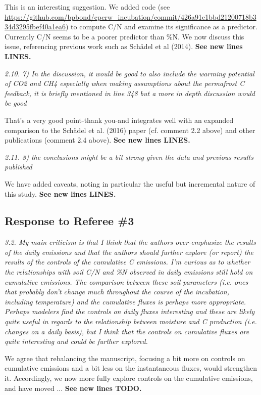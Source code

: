 \documentclass[11pt, oneside]{article}
\begin{document}
This is an interesting suggestion. We added code (see \url{https://github.com/bpbond/cpcrw_incubation/commit/426a91e1bbd21200718b334d3295fbef40a1ea6}) to compute C/N and examine its significance as a predictor. Currently C/N seems to be a poorer predictor than \%N. We now discuss this issue, referencing previous work such as Schädel et al (2014). {\bf See new lines LINES.}

\medskip
{\it 2.10. 7) In the discussion, it would be good to also include the warming potential of CO2 and CH4 especially when making assumptions about the permafrost C feedback, it is briefly mentioned in line 348 but a more in depth discussion would be good }

That's a very good point-thank you-and integrates well with an expanded comparison to the Schädel et al. (2016) paper (cf. comment 2.2 above) and other publications (comment 2.4 above). {\bf See new lines LINES.}

\medskip
{\it 2.11. 8) the conclusions might be a bit strong given the data and previous results published }

We have added caveats, noting in particular the useful but incremental nature of this study. {\bf See new lines LINES.}


\newpage
\subsection*{Response to Referee \#3}

{\it 3.2. My main criticism is that I think that the authors over-emphasize the results of the daily emissions and that the authors should further explore (or report) the results of the controls of the cumulative C emissions. I'm curious as to whether the relationships with soil C/N and \%N observed in daily emissions still hold on cumulative emissions. The comparison between these soil parameters (i.e. ones that probably don't change much throughout the course of the incubation, including temperature) and the cumulative fluxes is perhaps more appropriate. Perhaps modelers find the controls on daily fluxes interesting and these are likely quite useful in regards to the relationship between moisture and C production (i.e. changes on a daily basis), but I think that the controls on cumulative fluxes are quite interesting and could be further explored. }

We agree that rebalancing the manuscript, focusing a bit more on controls on cumulative emissions and a bit less on the instantaneous fluxes, would strengthen it. Accordingly, we now more fully explore controls on the cumulative emissions, and have moved ... {\bf See new lines TODO.}
\end{document}
